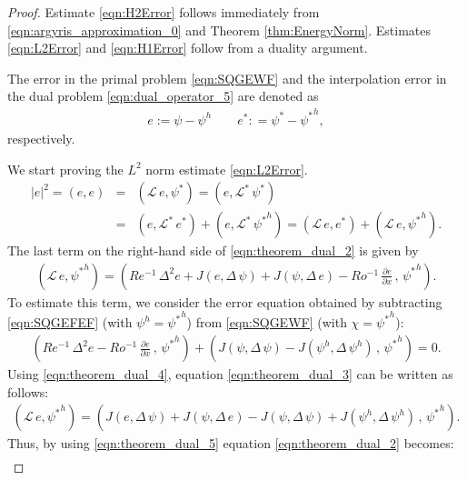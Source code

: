 \begin{proof}
Estimate \eqref{eqn:H2Error} follows immediately from \eqref{eqn:argyris_approximation_0} and Theorem \ref{thm:EnergyNorm}. 
Estimates \eqref{eqn:L2Error} and \eqref{eqn:H1Error} follow from a duality argument.

The error in the primal problem \eqref{eqn:SQGEWF} and the interpolation error in the dual problem  \eqref{eqn:dual_operator_5} are denoted as
\begin{eqnarray}
e
:= \psi
- \psi^h 
\qquad
e^*
: = \psi^*
- {\psi^*}^h ,
\label{eqn:theorem_dual_1}
\end{eqnarray}
respectively.

We start proving the $L^2$ norm estimate \eqref{eqn:L2Error}.
\begin{eqnarray}
|e|^2
= (e , e)
&=& (\mathcal{L} \, e , \psi^*)
= (e , \mathcal{L}^* \, \psi^*)
\nonumber \\
&=& (e , \mathcal{L}^* \, e^*)
+ (e , \mathcal{L}^* \, {\psi^*}^h)
= (\mathcal{L} \, e , e^*)
+ (\mathcal{L} \, e , {\psi^*}^h) .
\label{eqn:theorem_dual_2}
\end{eqnarray}
The last term on the right-hand side of \eqref{eqn:theorem_dual_2} is given by
\begin{eqnarray}
(\mathcal{L} \, e , {\psi^*}^h)
= \left(
Re^{-1} \, \Delta^2 e
+ J(e , \Delta \, \psi)
+ J(\psi , \Delta \, e)
- Ro^{-1} \, \frac{\partial e}{\partial x}
 \, , \,  
{\psi^*}^h
\right) .
\label{eqn:theorem_dual_3}
\end{eqnarray}
To estimate this term, we consider the error equation obtained by subtracting \eqref{eqn:SQGEFEF} (with $\psi^h= {\psi^*}^h$) from \eqref{eqn:SQGEWF} (with $\chi = {\psi^*}^h$):
\begin{eqnarray}
\left(
Re^{-1} \, \Delta^2 e
- Ro^{-1} \, \frac{\partial e}{\partial x}
 \, , \,  
{\psi^*}^h
\right)
+ \left(
 J(\psi , \Delta \, \psi)
- J(\psi^h , \Delta \, \psi^h)
 \, , \,  
{\psi^*}^h
\right)
= 0 .
\label{eqn:theorem_dual_4}
\end{eqnarray}
Using \eqref{eqn:theorem_dual_4}, equation \eqref{eqn:theorem_dual_3} can be written as follows:
\begin{eqnarray}
(\mathcal{L} \, e , {\psi^*}^h)
= \left(
 J(e , \Delta \, \psi)
+ J(\psi , \Delta \, e)
- J(\psi , \Delta \, \psi)
+ J(\psi^h , \Delta \, \psi^h)
 \, , \,  
{\psi^*}^h
\right) .
\label{eqn:theorem_dual_5}
\end{eqnarray}
Thus, by using \eqref{eqn:theorem_dual_5} equation \eqref{eqn:theorem_dual_2} becomes:
\begin{eqnarray}

\end{eqnarray}
\end{proof}
